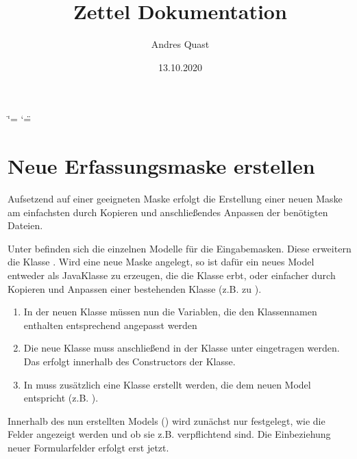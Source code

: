\documentclass[letterpaper,10pt,ngerman]{sphinxmanual}
\title{Zettel Dokumentation}
\date{13.10.2020}
\author{Andres Quast}
\begin{document}
\ifdefined\shorthandoff
  \ifnum\catcode`\=\string=\active\shorthandoff{=}\fi
  \ifnum\catcode`\"=\active{}\fi
\fi

\pagestyle{empty}
\sphinxmaketitle
\pagestyle{plain}
\sphinxtableofcontents
\pagestyle{normal}
\label{\detokenize{index::doc}}



\chapter{Neue Erfassungsmaske erstellen}
\label{\detokenize{developer-docs/createNewFormMask:neue-erfassungsmaske-erstellen}}\label{\detokenize{developer-docs/createNewFormMask::doc}}
Aufsetzend auf einer geeigneten Maske erfolgt die Erstellung einer neuen Maske am einfachsten durch Kopieren und  anschließendes Anpassen der benötigten Dateien.

Unter  befinden sich die einzelnen Modelle für die Eingabemasken. Diese erweitern die Klasse .
Wird eine neue Maske angelegt, so ist dafür ein neues Model entweder als Java\sphinxhyphen{}Klasse zu erzeugen, die die Klasse  erbt,
oder einfacher durch Kopieren und Anpassen einer bestehenden Klasse (z.B.  zu ).
\begin{enumerate}
%
\item {} 
In der neuen Klasse müssen nun die Variablen, die den Klassennamen enthalten entsprechend angepasst werden

\item {} 
Die neue Klasse muss anschließend in der Klasse  unter  eingetragen werden. Das erfolgt innerhalb des Constructors der Klasse.

\item {} 
In  muss zusätzlich eine Klasse erstellt werden, die dem neuen Model entspricht (z.B. ).

\end{enumerate}

Innerhalb des nun erstellten Models () wird zunächst nur festgelegt, wie die Felder angezeigt werden und ob sie z.B. verpflichtend sind.
Die Einbeziehung neuer Formularfelder erfolgt erst jetzt.
\end{document}
